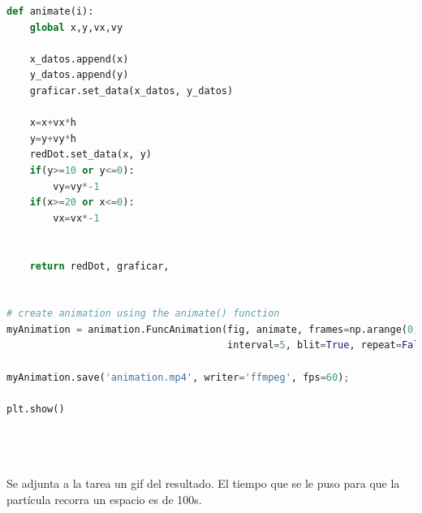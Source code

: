 \documentclass{article}
\begin{document}
\begin{flushleft}
\begin{enumerate}
\begin{lstlisting}[language=Python,caption=Ejercicio 3]
def animate(i):
    global x,y,vx,vy

    x_datos.append(x)
    y_datos.append(y)
    graficar.set_data(x_datos, y_datos)

    x=x+vx*h
    y=y+vy*h
    redDot.set_data(x, y)
    if(y>=10 or y<=0):
        vy=vy*-1
    if(x>=20 or x<=0):
        vx=vx*-1

    
    return redDot, graficar,


# create animation using the animate() function
myAnimation = animation.FuncAnimation(fig, animate, frames=np.arange(0,100,h), \
                                      interval=5, blit=True, repeat=False)

myAnimation.save('animation.mp4', writer='ffmpeg', fps=60);

plt.show()

     
                     
          \end{lstlisting}
   
    Se adjunta a la tarea un gif del resultado. El tiempo que se le puso para que la partícula recorra un espacio es de 100s.

\end{enumerate}
    


\end{flushleft}
\end{document}
